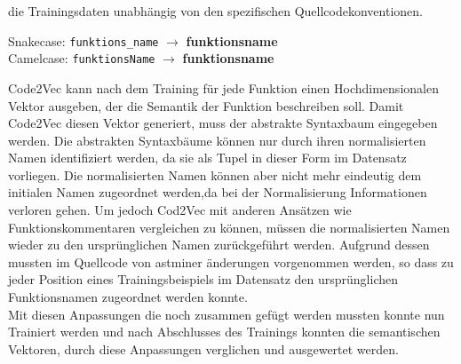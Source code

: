 \documentclass[12pt,letterpaper,ngerman]{article}
\begin{document}
die Trainingsdaten unabhängig von den spezifischen Quellcodekonventionen.
\begin{example}
  \hfill
  \begin{center}
    Snakecase: \verb|funktions_name| $\to$ {\bf funktions\text{\textbar}name } \\
    Camelcase: \verb|funktionsName| $\to$ {\bf funktions\text{\textbar}name}
  \end{center}
\end{example}
Code2Vec kann nach dem Training für jede Funktion einen Hochdimensionalen
Vektor ausgeben, der die Semantik der Funktion beschreiben soll. Damit Code2Vec
diesen Vektor generiert, muss der abstrakte Syntaxbaum eingegeben werden. Die
abstrakten Syntaxbäume können nur durch ihren normalisierten Namen identifiziert
werden, da sie als Tupel in dieser Form im Datensatz vorliegen.
Die normalisierten Namen können aber nicht mehr eindeutig dem initialen
Namen zugeordnet werden,da bei der Normalisierung Informationen verloren
gehen. Um jedoch Cod2Vec mit anderen Ansätzen wie Funktionskommentaren 
vergleichen zu können, müssen die normalisierten Namen wieder zu den
ursprünglichen Namen zurückgeführt werden. Aufgrund dessen mussten im
Quellcode von astminer änderungen vorgenommen werden, so dass zu jeder 
Position eines Trainingsbeispiels im Datensatz den ursprünglichen 
Funktionsnamen zugeordnet werden konnte. \\
Mit diesen Anpassungen die noch zusammen gefügt werden mussten konnte nun
Trainiert werden und nach Abschlusses des Trainings konnten die semantischen
Vektoren, durch diese Anpassungen verglichen und ausgewertet werden.
\end{document}
